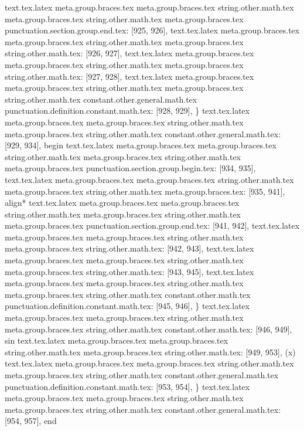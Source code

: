 {{{{{{{{{{{{{{{{{{{{{{{{{{{{{{text.tex.latex meta.group.braces.tex meta.group.braces.tex string.other.math.tex meta.group.braces.tex string.other.math.tex meta.group.braces.tex punctuation.section.group.end.tex: [925, 926], {}}
text.tex.latex meta.group.braces.tex meta.group.braces.tex string.other.math.tex meta.group.braces.tex string.other.math.tex: [926, 927], {
}
text.tex.latex meta.group.braces.tex meta.group.braces.tex string.other.math.tex meta.group.braces.tex string.other.math.tex: [927, 928], {
}
text.tex.latex meta.group.braces.tex meta.group.braces.tex string.other.math.tex meta.group.braces.tex string.other.math.tex constant.other.general.math.tex punctuation.definition.constant.math.tex: [928, 929], {\}
text.tex.latex meta.group.braces.tex meta.group.braces.tex string.other.math.tex meta.group.braces.tex string.other.math.tex constant.other.general.math.tex: [929, 934], {begin}
text.tex.latex meta.group.braces.tex meta.group.braces.tex string.other.math.tex meta.group.braces.tex string.other.math.tex meta.group.braces.tex punctuation.section.group.begin.tex: [934, 935], {{}
text.tex.latex meta.group.braces.tex meta.group.braces.tex string.other.math.tex meta.group.braces.tex string.other.math.tex meta.group.braces.tex: [935, 941], {align*}
text.tex.latex meta.group.braces.tex meta.group.braces.tex string.other.math.tex meta.group.braces.tex string.other.math.tex meta.group.braces.tex punctuation.section.group.end.tex: [941, 942], {}}
text.tex.latex meta.group.braces.tex meta.group.braces.tex string.other.math.tex meta.group.braces.tex string.other.math.tex: [942, 943], {
}
text.tex.latex meta.group.braces.tex meta.group.braces.tex string.other.math.tex meta.group.braces.tex string.other.math.tex: [943, 945], {  }
text.tex.latex meta.group.braces.tex meta.group.braces.tex string.other.math.tex meta.group.braces.tex string.other.math.tex constant.other.math.tex punctuation.definition.constant.math.tex: [945, 946], {\}
text.tex.latex meta.group.braces.tex meta.group.braces.tex string.other.math.tex meta.group.braces.tex string.other.math.tex constant.other.math.tex: [946, 949], {sin}
text.tex.latex meta.group.braces.tex meta.group.braces.tex string.other.math.tex meta.group.braces.tex string.other.math.tex: [949, 953], {(x)
}
text.tex.latex meta.group.braces.tex meta.group.braces.tex string.other.math.tex meta.group.braces.tex string.other.math.tex constant.other.general.math.tex punctuation.definition.constant.math.tex: [953, 954], {\}
text.tex.latex meta.group.braces.tex meta.group.braces.tex string.other.math.tex meta.group.braces.tex string.other.math.tex constant.other.general.math.tex: [954, 957], {end}
}}}}}}}}}}}}}}}}}}}}}}}}}}}}}}}}
